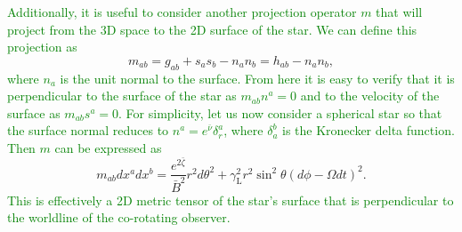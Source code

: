 \documentclass{aa}
\newcommand{\be}{\begin{equation}}
\newcommand{\ee}{\end{equation}}
\newcommand{\red}[1]{\textcolor{red}{#1}}
\newcommand{\refe}[1]{\textcolor{green}{{#1}}}
\newcommand{\refedel}[1]{\textcolor{red}{\sout{#1}}}
\newcommand{\nub}{\ensuremath{\bar{\nu}}}
\newcommand{\zetab}{\ensuremath{\bar{\zeta}}}
\newcommand{\Bb}{\ensuremath{\bar{B}}}
\newcommand{\lgamma}{\gamma_{\text{L}}}
\begin{document}
\refe{Additionally, it is useful to consider another projection operator $m$ that will project from the 3D space to the 2D surface of the star.}
\refe{We can define this projection as}
\be\label{eq:2dmetric}
m_{ab} = g_{ab} + s_a s_b - n_a n_b = h_{ab} - n_a n_b,
\ee
\refe{where $n_a$ is the unit normal to the surface.}
\refe{From here it is easy to verify that it is perpendicular to the surface of the star as $m_{ab} n^a = 0$ and to the velocity of the surface as $m_{ab} s^a = 0$.}
\refe{For simplicity, let us now consider a spherical star so that the surface normal reduces to $n^a = e^{\nub} \delta_r^a$, where $\delta_a^b$ is the Kronecker delta function.}
\refe{Then $m$ can be expressed as}
\be
m_{ab} dx^a dx^b = \frac{e^{2\zetab}}{\Bb^2} r^2 d\theta^2 + \lgamma^2 r^2 \sin^2\theta (d\phi - \Omega dt)^2.
\ee
\refe{This is effectively a 2D metric tensor of the star's surface that is perpendicular to the worldline of the co-rotating observer.}
\end{document}
